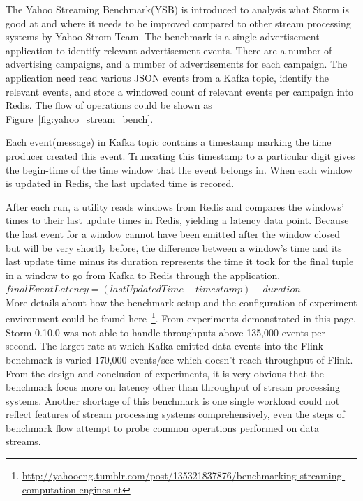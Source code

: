 The Yahoo Streaming Benchmark(YSB) is introduced to analysis what Storm is good at and where it needs to be improved compared to other stream processing systems by Yahoo Strom Team. \cite{YSB} The benchmark is a single advertisement application to identify relevant advertisement events. There are a number of advertising campaigns, and a number of advertisements for each campaign. The application need read various JSON events from a Kafka topic, identify the relevant events, and store a windowed count of relevant events per campaign into Redis. The flow of operations could be shown as Figure~\ref{fig:yahoo_stream_bench}.

Each event(message) in Kafka topic contains a timestamp marking the time producer created this event. Truncating this timestamp to a particular digit gives the begin-time of the time window that the event belongs in. When each window is updated in Redis, the last updated time is recored.

After each run, a utility reads windows from Redis and compares the windows' times to their last update times in Redis, yielding a latency data point. Because the last event for a window cannot have been emitted after the window closed but will be very shortly before, the difference between a window's time and its last update time minus its duration represents the time it took for the final tuple in a window to go from Kafka to Redis through the application. \\

$finalEventLatency = (lastUpdatedTime - timestamp) - duration$ \\

More details about how the benchmark setup and the configuration of experiment environment could be found here~\footnote{\url{http://yahooeng.tumblr.com/post/135321837876/benchmarking-streaming-computation-engines-at}}. From experiments demonstrated in this page, Storm 0.10.0 was not able to handle throughputs above 135,000 events per second. The larget rate at which Kafka emitted data events into the Flink benchmark is varied 170,000 events/sec which doesn't reach throughput of Flink. From the design and conclusion of experiments, it is very obvious that the benchmark focus more on latency other than throughput of stream processing systems. Another shortage of this benchmark is one single workload could not reflect features of stream processing systems comprehensively, even the steps of benchmark flow attempt to probe common operations performed on data streams.


\clearpage
